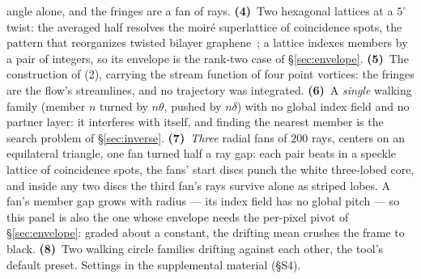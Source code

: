 \documentclass[acmtog, anonymous, review]{acmart}
\theoremstyle{plain}
\theoremstyle{definition}
\begin{document}
\begin{teaserfigure}
{  angle alone, and the fringes are a fan of rays. \textbf{(4)}~Two hexagonal
  lattices at a $5^\circ$ twist: the averaged half resolves the moir\'e
  superlattice of coincidence spots, the pattern that reorganizes twisted
  bilayer graphene~\cite{Cao2018Magic}; a lattice indexes members by a pair of
  integers, so its envelope is the rank-two case of \S\ref{sec:envelope}.
  \textbf{(5)}~The construction of (2), carrying the stream
  function of four point vortices: the fringes are the flow's streamlines, and
  no trajectory was integrated.   \textbf{(6)}~A \emph{single} walking family
  (member $n$ turned by $n\theta$, pushed by $n\delta$) with no global index
  field and no partner layer: it interferes with itself, and finding the
  nearest member is the search problem of \S\ref{sec:inverse}.
  \textbf{(7)}~\emph{Three} radial fans of $200$ rays, centers on an
  equilateral triangle, one fan turned half a ray gap: each pair beats in a
  speckle lattice of coincidence spots, the fans' start discs punch the
  white three-lobed core, and inside any two discs the third fan's rays
  survive alone as striped lobes. A fan's member gap grows with radius —
  its index field has no global pitch — so this panel is also the one whose
  envelope needs the per-pixel pivot of \S\ref{sec:envelope}: graded about
  a constant, the drifting mean crushes the frame to black.
  \textbf{(8)}~Two walking circle families drifting against each other, the
  tool's default preset.
  Settings in the supplemental material (\S S4).}
  \label{fig:teaser}
\end{teaserfigure}

\maketitle
















\appendix

\end{document}
